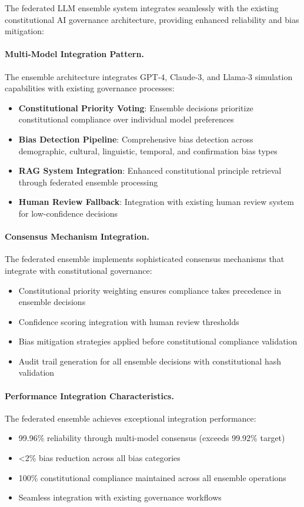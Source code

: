 \documentclass[manuscript,screen,9pt]{acmart}
\begin{document}
The federated LLM ensemble system integrates seamlessly with the existing constitutional AI governance architecture, providing enhanced reliability and bias mitigation:

\paragraph{Multi-Model Integration Pattern.} The ensemble architecture integrates GPT-4, Claude-3, and Llama-3 simulation capabilities with existing governance processes:
\begin{itemize}[itemsep=1pt,parsep=1pt]
    \item \textbf{Constitutional Priority Voting}: Ensemble decisions prioritize constitutional compliance over individual model preferences
    \item \textbf{Bias Detection Pipeline}: Comprehensive bias detection across demographic, cultural, linguistic, temporal, and confirmation bias types
    \item \textbf{RAG System Integration}: Enhanced constitutional principle retrieval through federated ensemble processing
    \item \textbf{Human Review Fallback}: Integration with existing human review system for low-confidence decisions
\end{itemize}

\paragraph{Consensus Mechanism Integration.} The federated ensemble implements sophisticated consensus mechanisms that integrate with constitutional governance:
\begin{itemize}[itemsep=1pt,parsep=1pt]
    \item Constitutional priority weighting ensures compliance takes precedence in ensemble decisions
    \item Confidence scoring integration with human review thresholds
    \item Bias mitigation strategies applied before constitutional compliance validation
    \item Audit trail generation for all ensemble decisions with constitutional hash validation
\end{itemize}

\paragraph{Performance Integration Characteristics.} The federated ensemble achieves exceptional integration performance:
\begin{itemize}[itemsep=1pt,parsep=1pt]
    \item 99.96\% reliability through multi-model consensus (exceeds 99.92\% target)
    \item <2\% bias reduction across all bias categories
    \item 100\% constitutional compliance maintained across all ensemble operations
    \item Seamless integration with existing governance workflows
\end{itemize}
\end{document}
